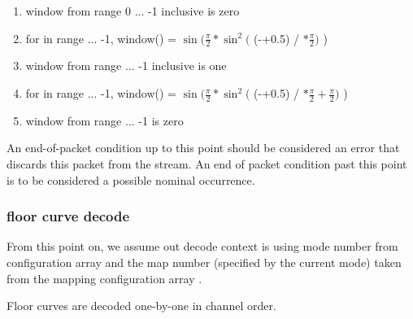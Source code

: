 \begin{enumerate}
 \item  window from range 0 ... -1 inclusive is zero
 \item  for \varname{[i]} in range  ...
-1, window(\varname{[i]}) = $\sin(\frac{\pi}{2} * \sin^2($ (\varname{[i]}-+0.5) / \varname{[left\_n]} $* \frac{\pi}{2})$ )
 \item  window from range  ... -1
inclusive is one\item  for \varname{[i]} in range  ... -1, window(\varname{[i]}) = $\sin(\frac{\pi}{2} * \sin^2($ (\varname{[i]}-+0.5) / \varname{[right\_n]} $ * \frac{\pi}{2} + \frac{\pi}{2})$ )
\item  window from range  ... \varname{[n]}-1 is
zero
\end{enumerate}

An end-of-packet condition up to this point should be considered an
error that discards this packet from the stream.  An end of packet
condition past this point is to be considered a possible nominal
occurrence.



\subsubsection{floor curve decode}

From this point on, we assume out decode context is using mode number
 from configuration array
 and the map number
 (specified by the current mode) taken
from the mapping configuration array
.

Floor curves are decoded one-by-one in channel order.

